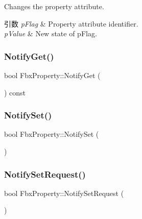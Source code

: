 Changes the property attribute. 
\begin{DoxyParams}{引数}
{\em p\+Flag} & Property attribute identifier. \\
\hline
{\em p\+Value} & New state of p\+Flag. \\
\hline
\end{DoxyParams}
\mbox{\label{class_fbx_property_abbb2f1f50f22fbcd94ad56e3373efaac}} 
\subsubsection{\texorpdfstring{Notify\+Get()}{NotifyGet()}}
{\footnotesize\ttfamily bool Fbx\+Property\+::\+Notify\+Get (\begin{DoxyParamCaption}{ }\end{DoxyParamCaption}) const\hspace{0.3cm}{\ttfamily [protected]}}

\mbox{\label{class_fbx_property_ac2a6a7d8711567294c90f37791846331}} 
\subsubsection{\texorpdfstring{Notify\+Set()}{NotifySet()}}
{\footnotesize\ttfamily bool Fbx\+Property\+::\+Notify\+Set (\begin{DoxyParamCaption}{ }\end{DoxyParamCaption})\hspace{0.3cm}{\ttfamily [protected]}}

\mbox{\label{class_fbx_property_afb12acf8aeec609f4df77c61e5346e59}} 
\subsubsection{\texorpdfstring{Notify\+Set\+Request()}{NotifySetRequest()}}
{\footnotesize\ttfamily bool Fbx\+Property\+::\+Notify\+Set\+Request (\begin{DoxyParamCaption}{ }\end{DoxyParamCaption})\hspace{0.3cm}{\ttfamily [protected]}}

